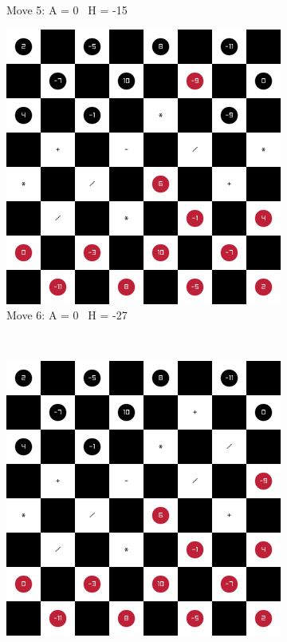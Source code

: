 \begin{figure}[H]
\begin{subfigure}{0.3\textwidth}
        \caption*{Move 5: A = 0 \textbar\ H = -15}
    \end{subfigure}
    \quad
    \begin{subfigure}{0.3\textwidth}
        \centering
        \includegraphics[width=\textwidth]{images/games/game1/move_7.png}
        \caption*{Move 6: A = 0 \textbar\ H = -27}
    \end{subfigure} \\
    \begin{subfigure}{0.3\textwidth}
        \centering
        \includegraphics[width=\textwidth]{images/games/game1/move_8.png}

\end{subfigure}
\end{figure}
